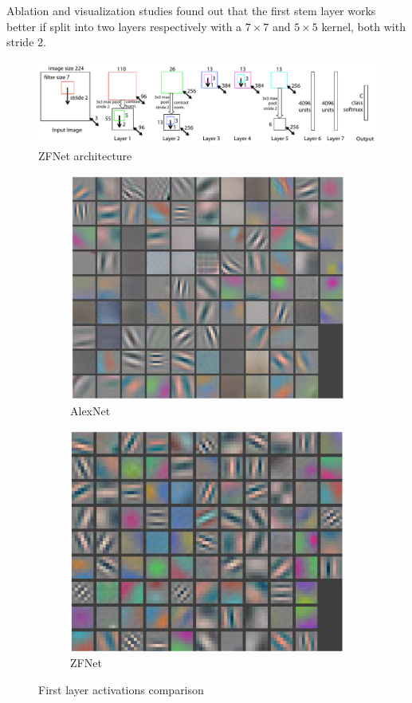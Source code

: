 Ablation and visualization studies found out that the first stem layer works better if split into two layers
respectively with a $7 \times 7$ and $5 \times 5$ kernel, both with stride $2$.

\begin{figure}[H]
    \centering
    \includegraphics[width=0.8\linewidth]{./img/_zfnet.pdf}
    \caption{ZFNet architecture}
\end{figure}

\begin{figure}[H]
    \centering
    \begin{subfigure}{0.4\linewidth}
        \centering
        \includegraphics[width=0.55\linewidth]{./img/alexnet_stem.png}
        \caption{AlexNet}
    \end{subfigure}
    \begin{subfigure}{0.4\linewidth}
        \centering
        \includegraphics[width=0.55\linewidth]{./img/zfnet_stem.png}
        \caption{ZFNet}
    \end{subfigure}
    \caption{First layer activations comparison}
\end{figure}


